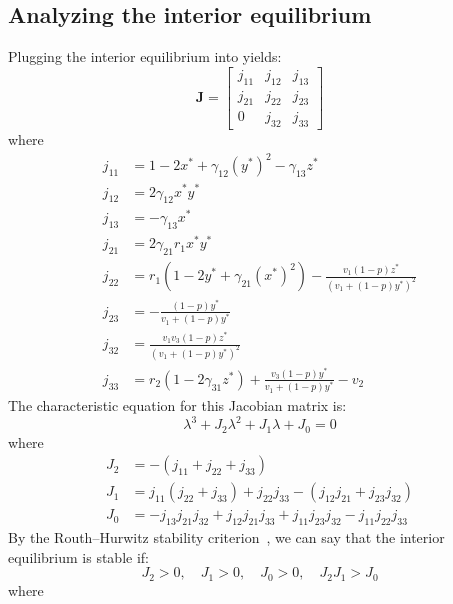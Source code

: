 \subsection{Analyzing the interior equilibrium}\label{subsec:stability_interior_equilibrium}
Plugging the interior equilibrium into  yields:
\begin{equation}
    \textbf{J}=\begin{bmatrix}
        j_{11} & j_{12} & j_{13}\\
        j_{21} & j_{22} & j_{23}\\
        0 & j_{32} & j_{33}
    \end{bmatrix}
    \label{eq:5.16}
\end{equation}
where
\begin{align*}
    j_{11} &= 1-2x^*+\gamma_{12}\left(y^*\right)^2-\gamma_{13}z^*\\
    j_{12} &= 2\gamma_{12}x^*y^*\\
    j_{13} &= -\gamma_{13}x^*\\
    j_{21} &= 2\gamma_{21}r_1x^*y^*\\
    j_{22} &= r_1\left(1-2y^*+\gamma_{21}\left(x^*\right)^2\right)-\frac{v_1\left(1-p\right)z^*}{\left(v_1+\left(1-p\right)y^*\right)^2}\\
    j_{23} &= -\frac{\left(1-p\right)y^*}{v_1+\left(1-p\right)y^*}\\
    j_{32} &= \frac{v_1v_3\left(1-p\right)z^*}{\left(v_1+\left(1-p\right)y^*\right)^2}\\
    j_{33} &= r_2\left(1-2\gamma_{31}z^*\right)+\frac{v_3\left(1-p\right)y^*}{v_1+\left(1-p\right)y^*}-v_2
\end{align*}
The characteristic equation for this Jacobian matrix is:
\begin{equation}
    \lambda^3+J_2\lambda^2+J_1\lambda+J_0=0
    \label{eq:5.17}
\end{equation}
where
\begin{align*}
    J_2 &= -\left(j_{11}+j_{22}+j_{33}\right)\\
    J_1 &= j_{11}\left(j_{22}+j_{33}\right)+j_{22}j_{33}-\left(j_{12}j_{21}+j_{23}j_{32}\right)\\
    J_0 &= -j_{13}j_{21}j_{32}+j_{12}j_{21}j_{33}+j_{11}j_{23}j_{32}-j_{11}j_{22}j_{33}
\end{align*}
By the Routh–Hurwitz stability criterion~\cite{routh1877treatise}, we can say that the interior equilibrium is stable if:
\[
J_2>0,\quad J_1>0,\quad J_0>0,\quad J_2J_1>J_0
\]
where

